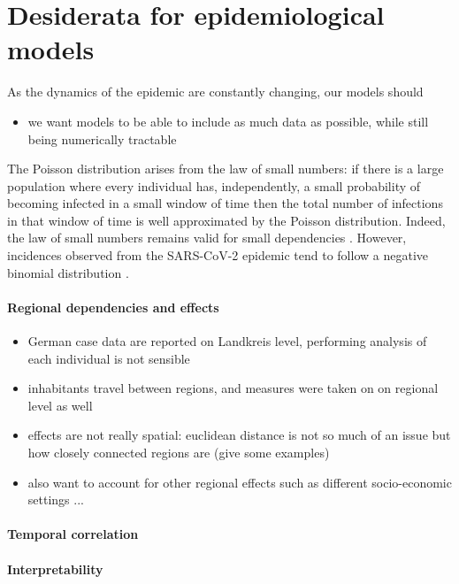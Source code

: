 \section{Desiderata for epidemiological models}
\label{sec:dessiderata}


As the dynamics of the epidemic are constantly changing, our models should

\begin{itemize}
    \item we want models to be able to include as much data as possible, while still being numerically tractable 
\end{itemize}

The Poisson distribution arises from the law of small numbers: if there is a large population where every individual has, independently, a small probability of becoming infected in a small window of time then the total number of infections in that window of time is well approximated by the Poisson distribution.
Indeed, the law of small numbers remains valid for small dependencies \cite{Ross2011Fundamentalsa,Arratia1990Poisson}.
However, incidences observed from the SARS-CoV-2 epidemic tend to follow a negative binomial distribution \cite{Chan2021Count}. 

\paragraph{Regional dependencies and effects}
\begin{itemize}
    \item German case data are reported on Landkreis level, performing analysis of each individual is not sensible 
    \item inhabitants travel between regions, and measures were taken on on regional level as well
    \item effects are not really spatial: euclidean distance is not so much of an issue but how closely connected regions are (give some examples)
    \item also want to account for other regional effects such as different socio-economic settings ... 
\end{itemize}

\paragraph{Temporal correlation}

\paragraph{Interpretability}